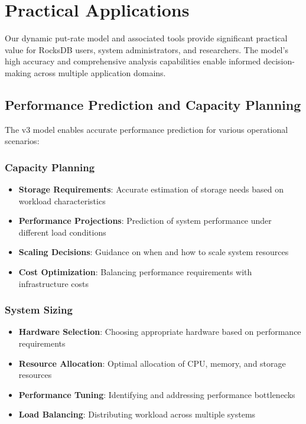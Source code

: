 \documentclass[11pt]{article}
\begin{document}
\section{Practical Applications}

Our dynamic put-rate model and associated tools provide significant practical value for RocksDB users, system administrators, and researchers. The model's high accuracy and comprehensive analysis capabilities enable informed decision-making across multiple application domains.

\subsection{Performance Prediction and Capacity Planning}

The v3 model enables accurate performance prediction for various operational scenarios:

\subsubsection{Capacity Planning}
\begin{itemize}
    \item \textbf{Storage Requirements}: Accurate estimation of storage needs based on workload characteristics
    \item \textbf{Performance Projections}: Prediction of system performance under different load conditions
    \item \textbf{Scaling Decisions}: Guidance on when and how to scale system resources
    \item \textbf{Cost Optimization}: Balancing performance requirements with infrastructure costs
\end{itemize}

\subsubsection{System Sizing}
\begin{itemize}
    \item \textbf{Hardware Selection}: Choosing appropriate hardware based on performance requirements
    \item \textbf{Resource Allocation}: Optimal allocation of CPU, memory, and storage resources
    \item \textbf{Performance Tuning}: Identifying and addressing performance bottlenecks
    \item \textbf{Load Balancing}: Distributing workload across multiple systems
\end{itemize}
\end{document}
